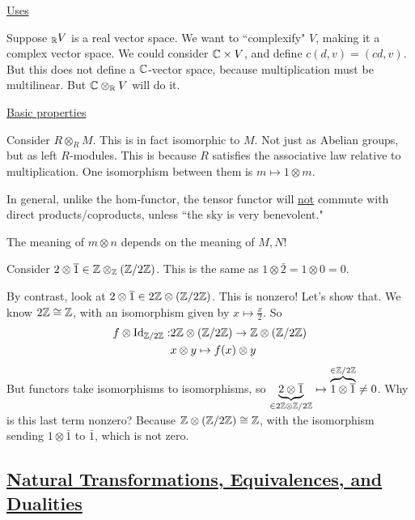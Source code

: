 \documentclass[x11names,reqno,14pt]{extarticle}
\begin{document}
\underline{Uses}

Suppose $_{\mathbb{R}} V$ is a real vector space. We want to ``complexify" $V$, making it a complex vector space. We could consider $\mathbb{C}\times V$, and define $c(d, v) = (cd, v)$. But this does not define a $\mathbb{C}$-vector space, because multiplication must be multilinear. But $\mathbb{C}\otimes_{\mathbb{R}} V$ will do it. 

\underline{Basic properties}

Consider $R\otimes_RM$. This is in fact isomorphic to $M$. Not just as Abelian groups, but as left $R$-modules. This is because $R$ satisfies the associative law relative to multiplication. One isomorphism between them is $m\mapsto 1\otimes m$.

In general, unlike the hom-functor, the tensor functor will \underline{not} commute with direct products/coproducts, unless ``the sky is very benevolent."



\dbend\dbend\dbend


The meaning of $m\otimes n$ depends on the meaning of $M, N$!

\exm 

Consider $2\otimes\overline{1}\in\mathbb{Z}\otimes_{\mathbb{Z}}(\mathbb{Z}/2\mathbb{Z})$. This is the same as $1\otimes\bar{2} = 1\otimes0 = 0$.

By contrast, look at $2\otimes\overline{1} \in 2\mathbb{Z}\otimes(\mathbb{Z}/2\mathbb{Z})$. This is nonzero! Let's show that. We know $2\mathbb{Z}\cong\mathbb{Z}$, with an isomorphism given by $x\mapsto\frac{x}{2}$. So 
\begin{align*}
f\otimes\operatorname{\mathrm{Id}}_{\mathbb{Z}/2\mathbb{Z}}:& 2\mathbb{Z}\otimes(\mathbb{Z}/2\mathbb{Z})\to\mathbb{Z}\otimes(\mathbb{Z}/2\mathbb{Z}) \\
							& x\otimes y \mapsto f(x)\otimes y \\
\end{align*}
But functors take isomorphisms to isomorphisms, so $\underbrace{2\otimes\overline{1}}_{\in2\mathbb{Z}\otimes\mathbb{Z}/2\mathbb{Z}}\mapsto\overbrace{1\otimes\overline{1}}^{\in\mathbb{Z}/2\mathbb{Z}}\neq0$. Why is this last term nonzero? Because $\mathbb{Z}\otimes(\mathbb{Z}/2\mathbb{Z}) \cong \mathbb{Z}$, with the isomorphism sending $1\otimes\bar{1}$ to $\bar{1}$, which is not zero. 

\subsection*{\underline{Natural Transformations, Equivalences, and Dualities}}

\end{document}
